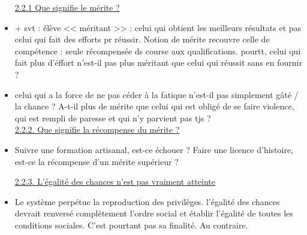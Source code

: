 \documentclass[12pt]{report}
\begin{document}
\begin{itemize}
\underline{2.2.1 Que signifie le mérite ?} \\

\item + svt : élève << méritant >> : celui qui obtient les meilleurs résultats et pas celui qui fait des efforts pr réussir. Notion de mérite recouvre celle de compétence : seule récompensée ds course aux qualifications. pourtt, celui qui fait plus d'éffort n'est-il pas plus méritant que celui qui réussit sans en fournir ?\\

\item celui qui a la force de ne pas céder à la fatique n'est-il pas simplement gâté / la chance ? A-t-il plus de mérite que celui qui est obligé de se faire violence, qui est rempli de paresse et qui n'y parvient pas tjs ? \\

\underline{2.2.2. Que signifie la récompense du mérite ?} \\

\item Suivre une formation artisanal, est-ce échouer ? Faire une licence d'histoire, est-ce la récompense d'un mérite supérieur ? 

\underline{2.2.3. L'égalité des chances n'est pas vraiment atteinte}\\

\item Le système perpétue la reproduction des privilèges. l'égalité des chances devrait renversé complètement l'ordre social et établir l'égalité de toutes les conditions sociales. C'est pourtant pas sa finalité. Au contraire.



\end{itemize}
\end{document}
